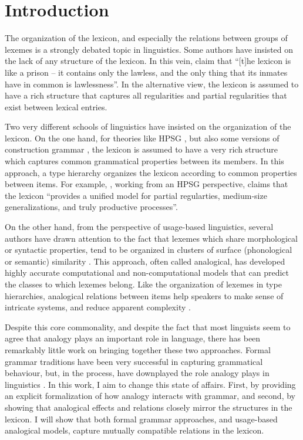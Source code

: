 \chapter{Introduction}\label{chap:introduction}
The organization of the lexicon, and especially the relations between groups of lexemes is a strongly debated topic in linguistics. Some authors have insisted on the lack of any structure of the lexicon.
In this vein, \textcite[p. 3]{DiSciullo.1987} claim that ``[t]he lexicon is like a prison -- it contains only the lawless, and the only thing that its inmates have in common is lawlessness''.
In the alternative view, the lexicon is assumed to have a rich structure that captures all regularities and partial regularities that exist between lexical entries.

Two very different schools of linguistics have insisted on the organization of the lexicon.
On the one hand, for theories like HPSG \autocite{Pollard.1994}, but also some versions of construction grammar \autocite{Fillmore.1995}, the lexicon is assumed to have a very rich structure which captures common grammatical properties between its members.
In this approach, a type hierarchy organizes the lexicon according to common properties between items.
For example, \textcite[p. 4, among others]{Koenig.1999}, working from an HPSG perspective, claims that the lexicon ``provides a unified model for partial regularties, medium-size generalizations, and truly productive processes''.

On the other hand, from the perspective of usage-based linguistics, several authors have drawn attention to the fact that lexemes which share morphological or syntactic properties, tend to be organized in clusters of surface (phonological or semantic) similarity \autocites{Bybee.1982, Eddington.1996, Skousen.1989}.
This approach, often called analogical, has developed highly accurate computational and non-computational models that can predict the classes to which lexemes belong.
Like the organization of lexemes in type hierarchies, analogical relations between items help speakers to make sense of intricate systems, and reduce apparent complexity \autocite{Kopcke.1984}.

Despite this core commonality, and despite the fact that most linguists seem to agree that analogy plays an important role in language, there has been remarkably little work on bringing together these two approaches.
Formal grammar traditions have been very successful in capturing grammatical behaviour, but, in the process, have downplayed the role analogy plays in linguistics \autocite{Anderson.2015}.
In this work, I aim to change this state of affairs.
First, by providing an explicit formalization of how analogy interacts with grammar, and second, by showing that analogical effects and relations closely mirror the structures in the lexicon.
I will show that both formal grammar approaches, and usage-based analogical models, capture mutually compatible relations in the lexicon.

